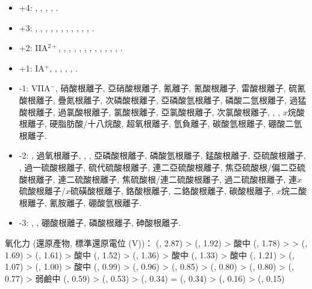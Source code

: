 \documentclass[a4paper,12pt]{report}
\begin{document}
\begin{itemize}
\item +4: , , , , .
\item +3: , , , , , , , , , , , .
\item +2: IIA$^{2+}$, , , , , , , , , , , , .
\item +1: IA$^+$, , , , , .
\item -1: VIIA$^-$, 硝酸根離子, 亞硝酸根離子, 氰離子, 氰酸根離子, 雷酸根離子, 硫氰酸根離子, 疊氮根離子, 次磷酸根離子, 亞磷酸氫根離子, 磷酸二氫根離子, 過猛酸根離子, 過氯酸根離子, 氯酸根離子, 亞氯酸根離子, 次氯酸根離子, , , $x$烷酸根離子, 硬脂肪酸/十八烷酸, 超氧根離子, 氫負離子, 碳酸氫根離子, 硼酸二氫根離子.
\item -2: , 過氧根離子, , , 亞磷酸根離子, 磷酸氫根離子, 錳酸根離子, 亞硫酸根離子, , 過一硫酸根離子, 硫代硫酸根離子, 連二亞硫酸根離子, 焦亞硫酸根/偏二亞硫酸根離子, 連二硫酸根離子, 焦硫酸根/連二硫酸根離子, 過二硫酸根離子, 連$x$硫酸根離子/$x$硫磺酸根離子, 鉻酸根離子, 二鉻酸根離子, 碳酸根離子, $x$烷二酸根離子, 氰胺離子, 硼酸氫根離子.
\item -3: , , 硼酸根離子, 磷酸根離子, 砷酸根離子.
\end{itemize}
氧化力 (還原產物, 標準還原電位 (V))： (, 2.87) >  (, 1.92) > 酸中  (, 1.78) > >  (, 1.69) >  (, 1.61) > 酸中  (, 1.52) >  (, 1.36) > 酸中  (, 1.33) > 酸中  (, 1.21) >  (, 1.07) >  (, 1.00) > 酸中  (, 0.99)  >  (, 0.96) >  (, 0.85) >  (, 0.80) >  (, 0.80) >  (, 0.77) > 弱鹼中  (, 0.59) >  (, 0.53) >  (, 0.34) =  (, 0.34) >  (, 0.16) >  (, 0.15)
\end{document}

